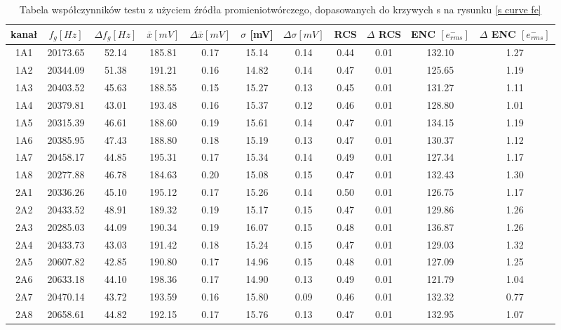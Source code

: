 \begin{table}
        \centering
        \caption{Tabela współczynników testu z użyciem źródła promieniotwórczego, dopasowanych do krzywych s na rysunku \ref{s curve fe}}
        \label{tabela wsp fe}
        \begin{adjustbox}{width=1.1\linewidth,center}
                \begin{tabular}{|c|c|c|c|c|c|c|c|c|c|c|}
                \hline
                kanał & $f_g [Hz]$&$\Delta f_g [Hz]$&$\overline{x} [mV]$&$\Delta \overline{x} [mV]$&  $\sigma$ [mV]&  $\Delta \sigma [mV]$ &RCS&$\Delta$ RCS& ENC $[e^-_{rms}]$& $\Delta$ ENC $[e^-_{rms}]$\\ \hline
                1A1&20173.65&52.14&185.81&0.17&15.14&0.14&0.44&0.01&132.10&1.27  \\ \hline 
                1A2&20344.09&51.38&191.21&0.16&14.82&0.14&0.47&0.01&125.65&1.19  \\ \hline 
                1A3&20403.52&45.63&188.55&0.15&15.27&0.13&0.45&0.01&131.27&1.11  \\ \hline 
                1A4&20379.81&43.01&193.48&0.16&15.37&0.12&0.46&0.01&128.80&1.01  \\ \hline 
                1A5&20315.39&46.61&188.60&0.19&15.61&0.14&0.47&0.01&134.15&1.19  \\ \hline 
                1A6&20385.95&47.43&188.80&0.18&15.19&0.13&0.47&0.01&130.37&1.12  \\ \hline 
                1A7&20458.17&44.85&195.31&0.17&15.34&0.14&0.49&0.01&127.34&1.17  \\ \hline 
                1A8&20277.88&46.78&184.63&0.20&15.08&0.15&0.47&0.01&132.43&1.30  \\ \hline 
                2A1&20336.26&45.10&195.12&0.17&15.26&0.14&0.50&0.01&126.75&1.17  \\ \hline 
                2A2&20433.52&48.91&189.32&0.19&15.17&0.15&0.47&0.01&129.86&1.26  \\ \hline 
                2A3&20285.03&44.09&190.34&0.19&16.07&0.15&0.48&0.01&136.87&1.26  \\ \hline 
                2A4&20433.73&43.03&191.42&0.18&15.24&0.15&0.47&0.01&129.03&1.32  \\ \hline 
                2A5&20607.82&42.85&190.80&0.17&14.96&0.15&0.48&0.01&127.09&1.25  \\ \hline 
                2A6&20633.18&44.10&198.36&0.17&14.90&0.13&0.49&0.01&121.79&1.04  \\ \hline 
                2A7&20470.14&43.72&193.59&0.16&15.80&0.09&0.46&0.01&132.32&0.77  \\ \hline 
                2A8&20658.61&44.82&192.15&0.17&15.76&0.13&0.47&0.01&132.95&1.07  \\ \hline 
                \end{tabular}
        \end{adjustbox}

\end{table}


